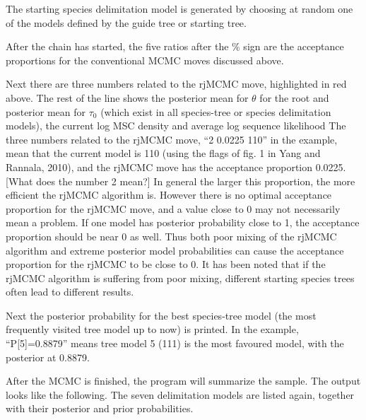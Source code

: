 \documentclass[a4paper]{book}
\numberwithin{equation}{section} \renewcommand{\baselinestretch}{0.55}
\begin{document}
The starting species delimitation model is generated by choosing at
random one of the models defined by the guide tree or starting tree.

After the chain has started, the five ratios after the \% sign are the
acceptance proportions for the conventional MCMC moves discussed
above.

Next there are three numbers related to the rjMCMC move, highlighted
in red above.  The rest of the line shows the posterior mean for
$\theta$ for the root and posterior mean for $\tau_0$ (which exist in
all species-tree or species delimitation models), the current log MSC
density and average log sequence likelihood The three numbers related
to the rjMCMC move, ``2 0.0225 110'' in the example, mean that the
current model is 110 (using the flags of fig.  1 in Yang and Rannala,
2010), and the rjMCMC move has the acceptance proportion 0.0225.
[What does the number 2 mean?]  In general the larger this proportion,
the more efficient the rjMCMC algorithm is.  However there is no
optimal acceptance proportion for the rjMCMC move, and a value close
to 0 may not necessarily mean a problem.  If one model has posterior
probability close to 1, the acceptance proportion should be near 0 as
well.  Thus both poor mixing of the rjMCMC algorithm and extreme
posterior model probabilities can cause the acceptance proportion for
the rjMCMC to be close to 0.  It has been noted that if the rjMCMC
algorithm is suffering from poor mixing, different starting species
trees often lead to different results.

Next the posterior probability for the best species-tree model (the
most frequently visited tree model up to now) is printed.  In the
example, ``P[5]=0.8879'' means tree model 5 (111) is the most favoured
model, with the posterior at 0.8879.

After the MCMC is finished, the program will summarize the sample.
The output looks like the following.  The seven delimitation models
are listed again, together with their posterior and prior
probabilities.
\end{document}
